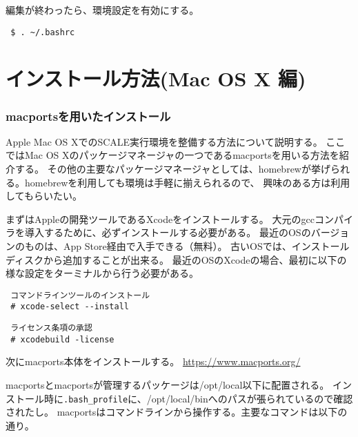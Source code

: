 編集が終わったら、環境設定を有効にする。
\begin{verbatim}
 $ . ~/.bashrc
\end{verbatim}


\section{インストール方法(Mac OS X 編)}

\subsubsection{macportsを用いたインストール}

Apple Mac OS XでのSCALE実行環境を整備する方法について説明する。
ここではMac OS Xのパッケージマネージャの一つであるmacportsを用いる方法を紹介する。
その他の主要なパッケージマネージャとしては、homebrewが挙げられる。homebrewを利用しても環境は手軽に揃えられるので、
興味のある方は利用してもらいたい。

まずはAppleの開発ツールであるXcodeをインストールする。
大元のgccコンパイラを導入するために、必ずインストールする必要がある。
最近のOSのバージョンのものは、App Store経由で入手できる（無料）。
古いOSでは、インストールディスクから追加することが出来る。
最近のOSのXcodeの場合、最初に以下の様な設定をターミナルから行う必要がある。
\begin{verbatim}
 コマンドラインツールのインストール
 # xcode-select --install
\end{verbatim}
\begin{verbatim}
 ライセンス条項の承認
 # xcodebuild -license
\end{verbatim}

次にmacports本体をインストールする。
\url{https://www.macports.org/}

macportsとmacportsが管理するパッケージは/opt/local以下に配置される。
インストール時に\verb|.bash_profile|に、/opt/local/binへのパスが張られているので確認されたし。
macportsはコマンドラインから操作する。主要なコマンドは以下の通り。

